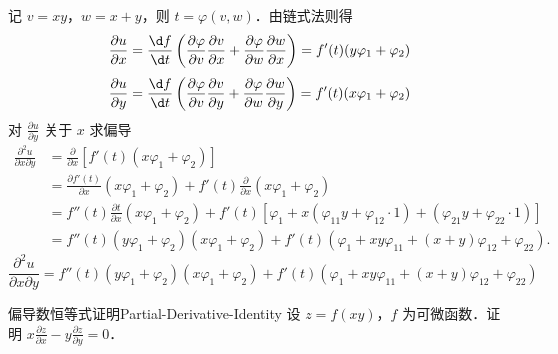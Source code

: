 \begin{solution}
    记 $v = xy$，$w = x + y$，则 $t = \varphi(v, w)$．由链式法则得
    \begin{equation}
        \frac{\partial u}{\partial x} = \frac{\d f}{\d t} \left( \frac{\partial \varphi}{\partial v} \frac{\partial v}{\partial x} + \frac{\partial \varphi}{\partial w} \frac{\partial w}{\partial x} \right) = f'(t) (y \varphi_1 + \varphi_2)
    \end{equation}
    \begin{equation}
        \frac{\partial u}{\partial y} = \frac{\d f}{\d t} \left( \frac{\partial \varphi}{\partial v} \frac{\partial v}{\partial y} + \frac{\partial \varphi}{\partial w} \frac{\partial w}{\partial y} \right) = f'(t) (x \varphi_1 + \varphi_2)
    \end{equation}
    对 $\frac{\partial u}{\partial y}$ 关于 $x$ 求偏导
    \begin{equation}
        \begin{aligned}
            \frac{\partial^2 u}{\partial x \partial y} & = \frac{\partial}{\partial x} [f'(t) (x \varphi_1 + \varphi_2)]                                                                                                            \\
                                                       & = \frac{\partial f'(t)}{\partial x} (x \varphi_1 + \varphi_2) + f'(t) \frac{\partial}{\partial x} (x \varphi_1 + \varphi_2)                                                \\
                                                       & = f''(t) \frac{\partial t}{\partial x} (x \varphi_1 + \varphi_2) + f'(t) [\varphi_1 + x (\varphi_{11} y + \varphi_{12} \cdot 1) + (\varphi_{21} y + \varphi_{22} \cdot 1)] \\
                                                       & = f''(t) (y \varphi_1 + \varphi_2) (x \varphi_1 + \varphi_2) + f'(t) (\varphi_1 + xy \varphi_{11} + (x + y) \varphi_{12} + \varphi_{22}).
        \end{aligned}
    \end{equation}
    \begin{equation}
        \boxed{\frac{\partial^2 u}{\partial x \partial y} = f''(t) (y \varphi_1 + \varphi_2) (x \varphi_1 + \varphi_2) + f'(t) (\varphi_1 + xy \varphi_{11} + (x + y) \varphi_{12} + \varphi_{22})}
    \end{equation}
\end{solution}

\begin{problem}{偏导数恒等式证明}{Partial-Derivative-Identity}
    设 $z = f(xy)$，$f$ 为可微函数．证明 $x \frac{\partial z}{\partial x} - y \frac{\partial z}{\partial y} = 0$．
\end{problem}

